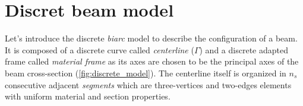 

\section{Discret beam model}\label{sec:dmodel}
Let's introduce the discrete \emph{biarc} model to describe the configuration of a beam. It is composed of a discrete curve called \emph{centerline} ($\Gamma$) and a discrete adapted frame called \emph{material frame} as its axes are chosen to be the principal axes of the beam cross-section (\cref{fig:discrete_model}). The centerline itself is organized in $n_s$ consecutive adjacent \emph{segments} which are three-vertices and two-edges elements with uniform material and section properties.


